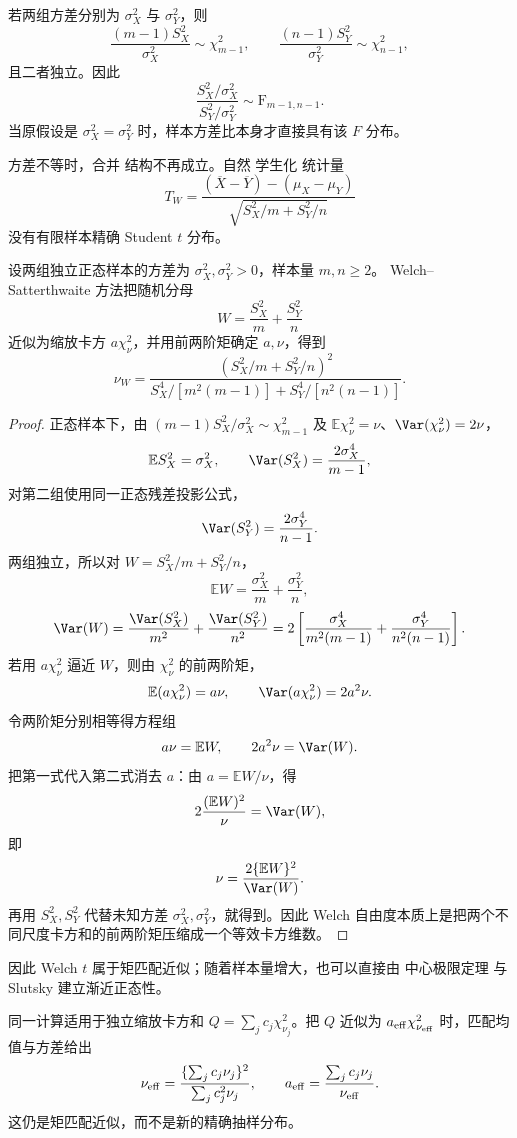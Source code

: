 若两组方差分别为 $\sigma_X^2$ 与 $\sigma_Y^2$，则
\[
 \frac{(m-1)S_X^2}{\sigma_X^2}\sim\chi^2_{m-1},
 \qquad
 \frac{(n-1)S_Y^2}{\sigma_Y^2}\sim\chi^2_{n-1},
\]
且二者独立。因此
\begin{equation*}\frac{S_X^2/\sigma_X^2}{S_Y^2/\sigma_Y^2}
 \sim\mathrm F_{m-1,n-1}.
\end{equation*}
当原假设是 $\sigma_X^2=\sigma_Y^2$ 时，样本方差比本身才直接具有该 $F$ 分布。

方差不等时，合并 结构不再成立。自然 学生化 统计量
\[
 T_W
 =\frac{(\overline X-\overline Y)-(\mu_X-\mu_Y)}
 {\sqrt{S_X^2/m+S_Y^2/n}}
\]
没有有限样本精确 Student $t$ 分布。\begin{proposition}
设两组独立正态样本的方差为 $\sigma_X^2,\sigma_Y^2>0$，样本量 $m,n\ge2$。
Welch--Satterthwaite 方法把随机分母
\[
 W=\frac{S_X^2}{m}+\frac{S_Y^2}{n}
\]
近似为缩放卡方 $a\chi^2_\nu$，并用前两阶矩确定 $a,\nu$，得到
\begin{equation}\label{eq:math-stat-welch-df}
 \nu_W
 =\frac{(S_X^2/m+S_Y^2/n)^2}
 {S_X^4/[m^2(m-1)]+S_Y^4/[n^2(n-1)]}.
\end{equation}
\end{proposition}
\begin{proof}
正态样本下，由 $(m-1)S_X^2/\sigma_X^2\sim\chi^2_{m-1}$ 及 $\mathbb E\chi^2_\nu=\nu$、$\Var(\chi^2_\nu)=2\nu$，
\[
 \mathbb E S_X^2=\sigma_X^2,
 \qquad
 \Var(S_X^2)=\frac{2\sigma_X^4}{m-1},
\]
对第二组使用同一正态残差投影公式，
\[
 \Var(S_Y^2)=\frac{2\sigma_Y^4}{n-1}.
\]
两组独立，所以对 $W=S_X^2/m+S_Y^2/n$，
\[
 \mathbb E W
 =\frac{\sigma_X^2}{m}+\frac{\sigma_Y^2}{n},
\]
\[
 \Var(W)
 =\frac{\Var(S_X^2)}{m^2}+\frac{\Var(S_Y^2)}{n^2}
 =2\left[
 \frac{\sigma_X^4}{m^2(m-1)}
 +\frac{\sigma_Y^4}{n^2(n-1)}
 \right].
\]
若用 $a\chi^2_\nu$ 逼近 $W$，则由 $\chi^2_\nu$ 的前两阶矩，
\[
 \mathbb E(a\chi^2_\nu)=a\nu,
 \qquad
 \Var(a\chi^2_\nu)=2a^2\nu.
\]
令两阶矩分别相等得方程组
\[
a\nu=\mathbb E W,
\qquad
2a^2\nu=\Var(W).
\]
把第一式代入第二式消去 $a$：由 $a=\mathbb E W/\nu$，得
\[
2\frac{(\mathbb E W)^2}{\nu}=\Var(W),
\]
即
\[
 \nu
 =\frac{2\{\mathbb E W\}^2}{\Var(W)}.
\]
再用 $S_X^2,S_Y^2$ 代替未知方差 $\sigma_X^2,\sigma_Y^2$，就得到。因此 Welch 自由度本质上是把两个不同尺度卡方和的前两阶矩压缩成一个等效卡方维数。
\end{proof}
因此 Welch $t$ 属于矩匹配近似；随着样本量增大，也可以直接由 中心极限定理 与 Slutsky 建立渐近正态性。

同一计算适用于独立缩放卡方和 $Q=\sum_j c_j\chi^2_{\nu_j}$。把 $Q$ 近似为 $a_{\rm eff}\chi^2_{\nu_{\rm eff}}$ 时，匹配均值与方差给出
\[
\nu_{\rm eff}
=\frac{\{\sum_j c_j\nu_j\}^2}{\sum_j c_j^2\nu_j},
\qquad
a_{\rm eff}=\frac{\sum_j c_j\nu_j}{\nu_{\rm eff}}.
\]
这仍是矩匹配近似，而不是新的精确抽样分布。

